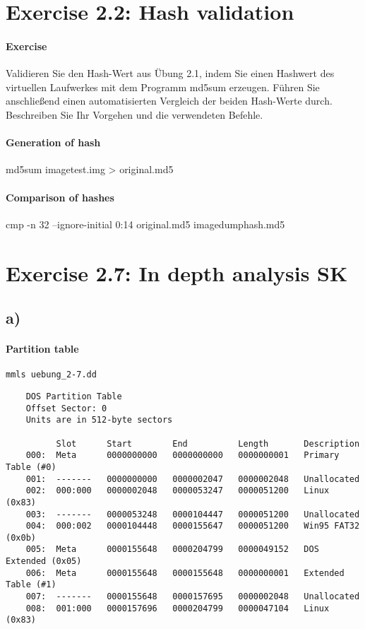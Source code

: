 \documentclass[10pt,a4paper]{article}
\begin{document}

\section{Exercise 2.2: Hash validation}

\paragraph{Exercise}
Validieren Sie den Hash-Wert aus Übung 2.1, indem Sie einen Hashwert des virtuellen Laufwerkes mit dem Programm
md5sum erzeugen. Führen Sie anschließend einen automatisierten Vergleich der beiden Hash-Werte durch. Beschreiben
Sie Ihr Vorgehen und die verwendeten Befehle.

\paragraph{Generation of hash}
md5sum imagetest.img > original.md5

\paragraph{Comparison of hashes}
cmp -n 32 --ignore-initial 0:14 original.md5 imagedumphash.md5




\section{Exercise 2.7: In depth analysis SK}
\subsection{a)}
\paragraph{Partition table}
\Verb+mmls uebung_2-7.dd+
\begin{lstlisting}
    DOS Partition Table
    Offset Sector: 0
    Units are in 512-byte sectors
    
          Slot      Start        End          Length       Description
    000:  Meta      0000000000   0000000000   0000000001   Primary Table (#0)
    001:  -------   0000000000   0000002047   0000002048   Unallocated
    002:  000:000   0000002048   0000053247   0000051200   Linux (0x83)
    003:  -------   0000053248   0000104447   0000051200   Unallocated
    004:  000:002   0000104448   0000155647   0000051200   Win95 FAT32 (0x0b)
    005:  Meta      0000155648   0000204799   0000049152   DOS Extended (0x05)
    006:  Meta      0000155648   0000155648   0000000001   Extended Table (#1)
    007:  -------   0000155648   0000157695   0000002048   Unallocated
    008:  001:000   0000157696   0000204799   0000047104   Linux (0x83)
\end{lstlisting}
\end{document}
